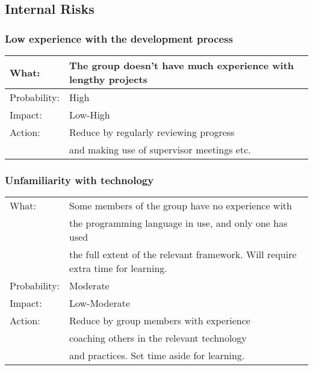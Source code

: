 
\subsection{Internal Risks}
\subsubsection{Low experience with the development process}
\begin{tabular}{| l | l |}
	\hline
	What: & The group doesn't have much experience with lengthy projects\\
	\hline
	Probability: & High \\
	\hline
	Impact: & Low-High \\
	\hline
	Action: & Reduce by regularly reviewing progress\\
	& and making use of supervisor meetings etc.\\
	\hline

\end{tabular}

\subsubsection{Unfamiliarity with technology}
\begin{tabular}{| l | l |}
	\hline
	What: & Some members of the group have no experience with\\
	& the programming language in use, and only one has used \\
	& the full extent of the relevant framework. Will require extra time for learning.\\
	\hline
	Probability: & Moderate \\
	\hline
	Impact: & Low-Moderate \\
	\hline
	Action: & Reduce by group members with experience \\
	& coaching others in the relevant technology\\
	& and practices. Set time aside for learning.\\
	\hline

\end{tabular}

